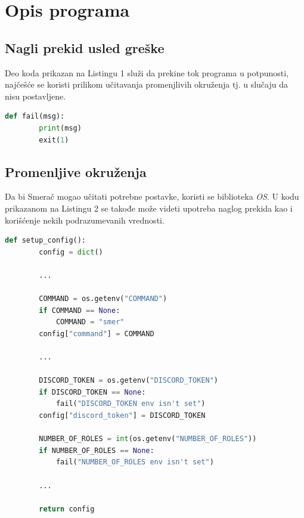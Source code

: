 \documentclass[a4paper,11pt]{article}
\begin{document}
\section{Opis programa}
\subsection{Nagli prekid usled greške}
Deo koda prikazan na Listingu 1 služi da prekine tok programa u potpunosti, najčešće se koristi prilikom učitavanja promenjlivih okruženja tj. u slučaju da nisu postavljene.
\begin{lstlisting}[language=Python, caption=Nagli prekid usled greške]
    def fail(msg):
        print(msg)
        exit(1)
\end{lstlisting}
\subsection{Promenljive okruženja}
Da bi Smerač mogao učitati potrebne postavke, koristi se biblioteka \textit{OS}. U kodu prikazanom na Listingu 2 se takođe može videti upotreba naglog prekida kao i korišćenje nekih podrazumevanih vrednosti.
\begin{lstlisting}[language=Python, caption=Učitavanje promenljivih okruženja]
    def setup_config():
        config = dict()

        ...

        COMMAND = os.getenv("COMMAND")
        if COMMAND == None:
            COMMAND = "smer"
        config["command"] = COMMAND

        ...

        DISCORD_TOKEN = os.getenv("DISCORD_TOKEN")
        if DISCORD_TOKEN == None:
            fail("DISCORD_TOKEN env isn't set")
        config["discord_token"] = DISCORD_TOKEN

        NUMBER_OF_ROLES = int(os.getenv("NUMBER_OF_ROLES"))
        if NUMBER_OF_ROLES == None:
            fail("NUMBER_OF_ROLES env isn't set")

        ...

        return config
\end{lstlisting}
\newpage
\end{document}
